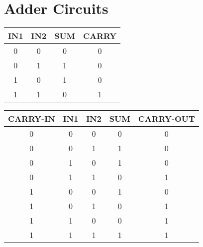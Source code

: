\chapter{Adder Circuits}

    \begin{tabular}{|c|c|c|c|}
      \hline 
      IN1 & IN2 & SUM & CARRY \\ 
      \hline 
      0 & 0 & 0 & 0 \\ 
      \hline 
      0 & 1 & 1 & 0 \\ 
      \hline 
      1 & 0 & 1 & 0 \\ 
      \hline 
      1 & 1 & 0 & 1 \\ 
      \hline 
    \end{tabular} 


\begin{tabular}{|c|c|c|c|c|}
    \hline 
    CARRY-IN & IN1 & IN2 & SUM & CARRY-OUT \\ 
    \hline 
    0 & 0 & 0 & 0 & 0 \\ 
    \hline 
    0 & 0 & 1 & 1 & 0 \\ 
    \hline 
    0 & 1 & 0 & 1 & 0 \\ 
    \hline 
    0 & 1 & 1 & 0 & 1 \\ 
    \hline 
    1 & 0 & 0 & 1 & 0 \\ 
    \hline 
    1 & 0 & 1 & 0 & 1 \\ 
    \hline 
    1 & 1 & 0 & 0 & 1 \\ 
    \hline 
    1 & 1 & 1 & 1 & 1 \\ 
    \hline 
\end{tabular} 

